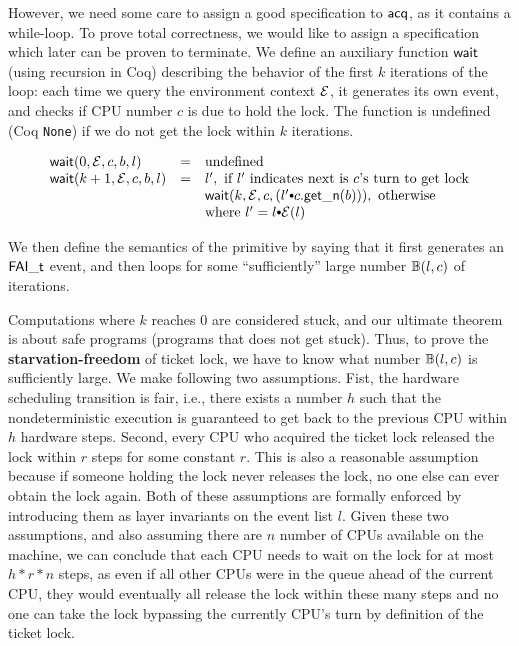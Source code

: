 However, we need some care to assign a good specification to
$\acq$, as it contains a while-loop. To prove total correctness,
we would like to assign a specification which later can be proven
to terminate.
We define an auxiliary function $\comm{wait}$
(using recursion in Coq) describing the behavior of the first $k$
iterations of the loop: each time we query the environment
context $\oracle$, it generates its own
event, and checks if CPU number $c$ is due to hold the
lock. The function is undefined (Coq {\tt None}) if we do not get the
lock within $k$ iterations.

\[
\begin{array}{lcl}
\mathsf{wait}(0, \oracle, c, b, l) & = &\text{undefined} \\
\mathsf{wait}(k+1, \oracle, c, b, l) & = & l', \text{ if $l'$ indicates next is $c$'s turn to get lock}\\
                       & &   \mathsf{wait}(k, \oracle, c,  (l' \cons c.\getnow(b))), \text{ otherwise} \\
                       & &  \text{where }l' = l \cons  \oracle(l)
\end{array}
\]

We then define the semantics of the primitive by saying that it first
generates an $\incticket$ event, and then loops
for some ``sufficiently'' large number $\calwait(l, c)$ of iterations.

\begin{mathpar}
\end{mathpar}

Computations where $k$ reaches 0 are considered stuck, and our
ultimate theorem is about safe programs (programs that does not get stuck).
Thus, to prove the \textbf{starvation-freedom} of ticket lock,
we have to know what number $\calwait(l,c)$ is sufficiently large.
We make following two assumptions. Fist, the hardware scheduling transition
is fair, i.e., there exists a number $h$ such that the nondeterministic execution is
guaranteed to get back to the previous CPU within $h$ hardware steps.
Second, every CPU who acquired the ticket lock released the lock within
$r$ steps for some constant $r$. This is also a reasonable assumption because if someone
holding the lock never releases the lock, no one else can ever obtain the lock
again. Both of these assumptions are formally enforced by introducing
them as layer invariants on the event list $l$.
Given these two assumptions, and also assuming there are $n$ number
of CPUs available on the machine, we can conclude that each CPU
needs to wait on the lock for at most $h * r * n$ steps, as even if all
other CPUs were in the queue ahead of the current CPU, they would eventually
all release the lock within these many steps and no one can take the lock
bypassing the currently CPU's turn by definition of the ticket lock.

